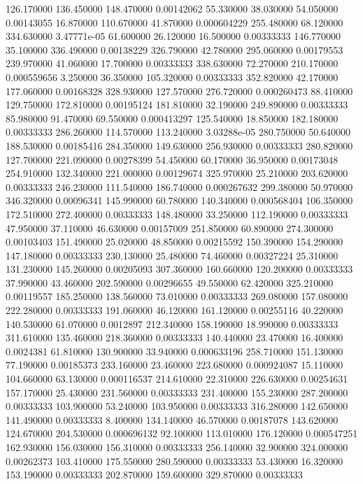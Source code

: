 126.170000	136.450000	148.470000	0.00142062
55.330000	38.030000	54.050000	0.00143055
16.870000	110.670000	41.870000	0.000604229
255.480000	68.120000	334.630000	3.47771e-05
61.600000	26.120000	16.500000	0.00333333
146.770000	35.100000	336.490000	0.00138229
326.790000	42.780000	295.060000	0.00179553
239.970000	41.060000	17.700000	0.00333333
338.630000	72.270000	210.170000	0.000559656
3.250000	36.350000	105.320000	0.00333333
352.820000	42.170000	177.060000	0.00168328
328.930000	127.570000	276.720000	0.000260473
88.410000	129.750000	172.810000	0.00195124
181.810000	32.190000	249.890000	0.00333333
85.980000	91.470000	69.550000	0.000413297
125.540000	18.850000	182.180000	0.00333333
286.260000	114.570000	113.240000	3.03288e-05
280.750000	50.640000	188.530000	0.00185416
284.350000	149.630000	256.930000	0.00333333
280.820000	127.700000	221.090000	0.00278399
54.450000	60.170000	36.950000	0.00173048
254.910000	132.340000	221.000000	0.00129674
325.970000	25.210000	203.620000	0.00333333
246.230000	111.540000	186.740000	0.000267632
299.380000	50.970000	346.320000	0.00096341
145.990000	60.780000	140.340000	0.000568404
106.350000	172.510000	272.400000	0.00333333
148.480000	33.250000	112.190000	0.00333333
47.950000	37.110000	46.630000	0.00157009
251.850000	60.890000	274.300000	0.00103403
151.490000	25.020000	48.850000	0.00215592
150.390000	154.290000	147.180000	0.00333333
230.130000	25.480000	74.460000	0.00327224
25.310000	131.230000	145.260000	0.00205093
307.360000	160.660000	120.200000	0.00333333
37.990000	43.460000	202.590000	0.00296655
49.550000	62.420000	325.210000	0.00119557
185.250000	138.560000	73.010000	0.00333333
269.080000	157.080000	222.280000	0.00333333
191.060000	46.120000	161.120000	0.00255116
40.220000	140.530000	61.070000	0.0012897
212.340000	158.190000	18.990000	0.00333333
311.610000	135.460000	218.360000	0.00333333
140.440000	23.470000	16.400000	0.0024381
61.810000	130.900000	33.940000	0.000633196
258.710000	151.130000	77.190000	0.00185373
233.160000	23.460000	223.680000	0.000924087
15.110000	104.660000	63.130000	0.000116537
214.610000	22.310000	226.630000	0.00254631
157.170000	25.430000	231.560000	0.00333333
231.400000	155.230000	287.200000	0.00333333
103.900000	53.240000	103.950000	0.00333333
316.280000	142.650000	141.490000	0.00333333
8.400000	134.140000	46.570000	0.00187078
143.620000	124.670000	204.530000	0.000696132
92.100000	113.010000	176.120000	0.000547251
162.930000	156.030000	156.310000	0.00333333
256.140000	32.900000	324.000000	0.00262373
103.410000	175.550000	280.590000	0.00333333
53.430000	16.320000	153.190000	0.00333333
202.870000	159.600000	329.870000	0.00333333
